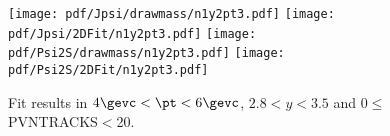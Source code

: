 \begin{figure}[H]
\begin{center}
\texttt{[image: pdf/Jpsi/drawmass/n1y2pt3.pdf]}
\texttt{[image: pdf/Jpsi/2DFit/n1y2pt3.pdf]}
\vspace*{-0.5cm}
\texttt{[image: pdf/Psi2S/drawmass/n1y2pt3.pdf]}
\texttt{[image: pdf/Psi2S/2DFit/n1y2pt3.pdf]}
\vspace*{-0.5cm}
\end{center}
\caption{Fit results in $4\gevc<\pt<6\gevc$, $2.8<y<3.5$ and 0$\leq$PVNTRACKS$<$20.}
\label{Fitn1y2pt3}
\end{figure}
